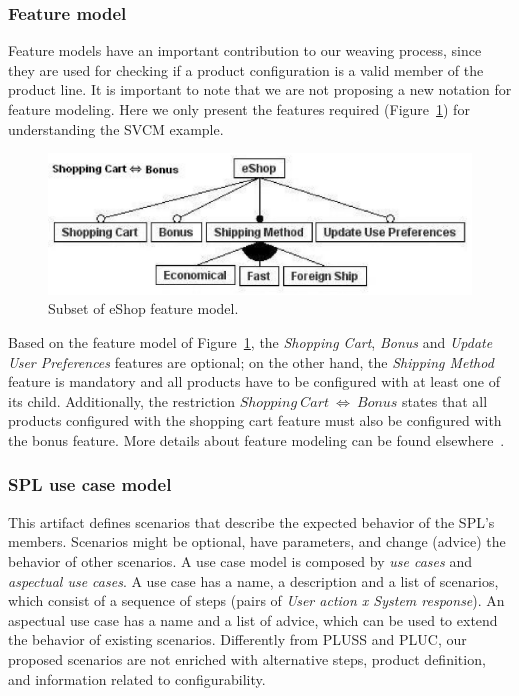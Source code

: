 \documentclass{acm_proc_article-sp}
\begin{document}
\subsubsection{Feature model}

Feature models have an important contribution to our
weaving process, since they are used for checking if a product
configuration is a valid member of the product line. It is important to note
that we are not proposing a new notation for feature modeling. Here we
only present the features required (Figure~\ref{fig:eshop-fm-re}) for
understanding the SVCM example.

\begin{figure}[h]
 \begin{center}
  \includegraphics[scale=0.40]{img/eShop-FM2.eps}
   \caption{Subset of eShop feature model.}
  \label{fig:eshop-fm-re}
  \end{center}
\end{figure}

Based on the feature model of Figure~\ref{fig:eshop-fm-re}, the \emph{Shopping
Cart}, \emph{Bonus} and \emph{Update User Preferences} features are optional; on
the other hand, the \emph{Shipping Method} feature is mandatory and all products
have to be configured with at least one of its child. Additionally, the
restriction $Shopping\ Cart\ \Leftrightarrow\ Bonus$ states that all
products configured with the shopping cart feature must also be configured with
the bonus feature. More details about feature modeling can be found
elsewhere~\cite{Gheyi:2006aa,Czarnecki:2000aa}.


\subsubsection{SPL use case model}

This artifact defines scenarios that describe the expected behavior of the SPL's
members. Scenarios might be optional, have parameters, and change (advice) the
behavior of other scenarios. A use case model is composed by \emph{use cases} and
\emph{aspectual use cases}. A use case has a name, a description and a list of
scenarios, which consist of a sequence of steps (pairs of \emph{User action x
System response}). An aspectual use case has a name and a list of advice, which
can be used to extend the behavior of existing scenarios. Differently from
PLUSS and PLUC, our proposed scenarios are not enriched with alternative steps,
product definition, and information related to configurability.  
\end{document}
